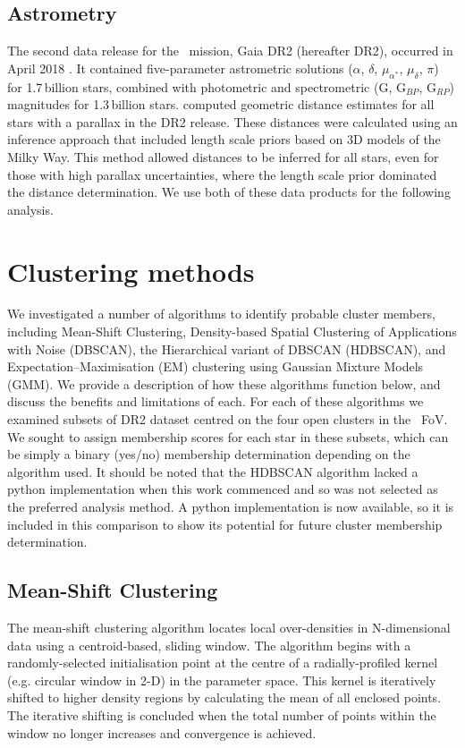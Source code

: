 \subsection{Astrometry}
The second data release for the \Gaia~mission, Gaia DR2 (hereafter DR2), occurred in April 2018 \citep{gaia_collaboration_gaia_2018}. It contained five-parameter astrometric solutions ($\alpha$, $\delta$, $\mu_{\alpha^*}$, $\mu_{\delta}$, $\pi$) for 1.7\,billion stars, combined with photometric and spectrometric (G, G$_{BP}$, G$_{RP}$) magnitudes for 1.3\,billion stars. \citet{bailer-jones_estimating_2018} computed geometric distance estimates for all stars with a parallax in the DR2 release. These distances were calculated using an inference approach that included length scale priors based on 3D models of the Milky Way. This method allowed distances to be inferred for all stars, even for those with high parallax uncertainties, where the length scale prior dominated the distance determination. We use both of these data products for the following analysis.

\section{Clustering methods}
We investigated a number of algorithms to identify probable cluster members, including Mean-Shift Clustering, Density-based Spatial Clustering of Applications with Noise (DBSCAN), the Hierarchical variant of DBSCAN (HDBSCAN), and Expectation–Maximisation (EM) clustering using Gaussian Mixture Models (GMM). We provide a description of how these algorithms function below, and discuss the benefits and limitations of each. For each of these algorithms we examined subsets of DR2 dataset centred on the four open clusters in the \Kepler~FoV. We sought to assign membership scores for each star in these subsets, which can be simply a binary (yes/no) membership determination depending on the algorithm used. It should be noted that the HDBSCAN algorithm lacked a python implementation when this work commenced and so was not selected as the preferred analysis method. A python implementation is now available, so it is included in this comparison to show its potential for future cluster membership determination.

\subsection{Mean-Shift Clustering}

The mean-shift clustering algorithm \citep{comaniciu_mean_2002} locates local over-densities in N-dimensional data using a centroid-based, sliding window. The algorithm begins with a randomly-selected initialisation point at the centre of a radially-profiled kernel (e.g. circular window in 2-D) in the parameter space. This kernel is iteratively shifted to higher density regions by calculating the mean of all enclosed points. The iterative shifting is concluded when the total number of points within the window no longer increases and convergence is achieved. 

